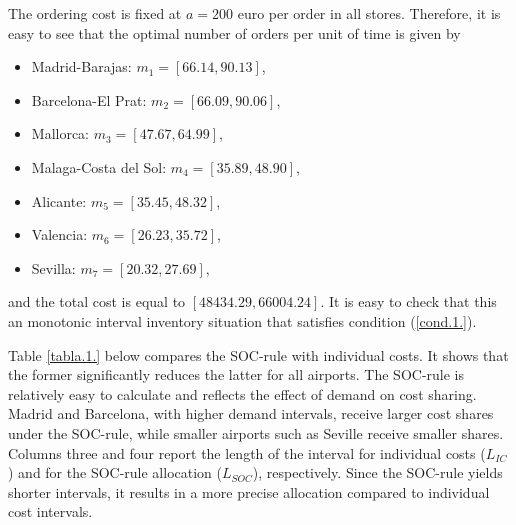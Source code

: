 \documentclass[12pt]{article}
\begin{document}
 The ordering cost is fixed at $a=200$ euro per order in all stores. Therefore, it is easy to see that the optimal number of orders per unit of time is given by
\begin{itemize}
\item Madrid-Barajas: $m_1 = [66.14, 90.13]$,

\item Barcelona-El Prat: $m_2 = [66.09, 90.06]$,

\item Mallorca: $m_3 = [47.67, 64.99]$,

\item Malaga-Costa del Sol: $m_4 = [35.89, 48.90]$,

\item Alicante: $m_5 = [35.45, 48.32]$,

\item Valencia: $m_6 = [26.23, 35.72]$,


\item Sevilla: $m_7 = [20.32, 27.69]$,
\end{itemize}
and the total cost is equal to $[48434.29,66004.24]$.  It is easy to check that this an monotonic interval inventory situation that satisfies condition (\ref{cond.1.}). 

Table \ref{tabla.1.} below compares the SOC-rule with individual costs. It shows that the former significantly reduces the latter for all airports. The SOC-rule is relatively easy to calculate and reflects the effect of demand on cost sharing. Madrid and Barcelona, with higher demand intervals, receive larger cost shares under the SOC-rule, while smaller airports such as Seville receive smaller shares. Columns three and four report the length of the interval for individual costs ($L_{IC}$) and for the SOC-rule allocation ($L_{SOC}$), respectively. Since the SOC-rule yields shorter intervals, it results in a more precise allocation compared to individual cost intervals.
\end{document}

